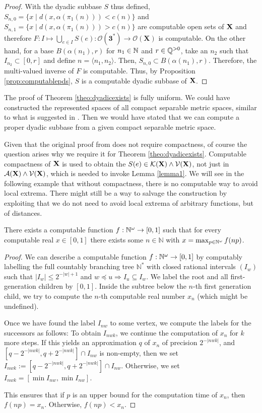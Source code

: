 \documentclass{eptcs-modified}
\begin{document}
\begin{proof}
With the dyadic subbase $S$ thus defined, $S_{n,0} = \{x \mid d(x, \alpha(\pi_1(n))) < c(n)\}$ and
$S_{n,1} = \{x \mid d(x, \alpha(\pi_1(n))) > c(n)\}$
are computable open sets of $\mathbf{X}$ and therefore $F: I \mapsto \bigcup_{e \in I} S(e): \mathcal{O}(\mathbf{3}^*) \to \mathcal{O}(\mathbf{X})$ is computable.
On the other hand,  for a base $B(\alpha(n_1), r)$ for $n_1 \in \mathbb{N}$ and $r \in \mathbb{Q}^{>0}$, take an $n_2$ such that $I_{n_2} \subset [0, r]$ and
define $n = \langle n_1, n_2 \rangle$. Then,
$S_{n,0} \subset B(\alpha(n_1), r)$.  Therefore, the multi-valued inverse of $F$ is computable.
Thus, by Proposition \ref{prop:computablepds},
$S$ is a computable dyadic subbase of $\mathbf{X}$.
\end{proof}

The proof of Theorem \ref{theo:dyadicexists} is fully uniform. We could have constructed the represented spaces of all compact separable metric spaces, similar to what is suggested in \cite{rettinger2}. Then we would have stated that we can compute a proper dyadic subbase from a given compact separable metric space.

Given that the original proof from \cite[Section 3.1]{tsukamoto} does not require compactness, of course the question arises why we require it for Theorem \ref{theo:dyadicexists}. Computable compactness of $\mathbf{X}$ is used to obtain the $S(e) \in \mathcal{K}(\mathbf{X}) \wedge \mathcal{V}(\mathbf{X})$, not just in $\mathcal{A}(\mathbf{X}) \wedge \mathcal{V}(\mathbf{X})$, which is needed to invoke Lemma \ref{lemma1}. We will see in the following example that without compactness, there is no computable way to avoid local extrema. There might still be a way to salvage the construction by exploiting that we do not need to avoid local extrema of arbitrary functions, but of distances.

\begin{example}
There exists a computable function $f : {\mathbb{N}^\omega} \to [0,1]$ such that for every computable real $x \in [0,1]$ there exists some $n \in \mathbb{N}$ with $x = \max_{p \in {\mathbb{N}^\omega}} f(np)$.
\begin{proof}
We can describe a computable function $f : {\mathbb{N}^\omega} \to [0,1]$ by computably labelling the full countably branching tree $\mathbb{N}^*$ with closed rational intervals $(I_w)$ such that $|I_w| \leq 2^{-|w|+1}$ and $w \preceq u \Rightarrow I_u \subseteq I_w$. We label the root and all first-generation children by $[0,1]$. Inside the subtree below the $n$-th first generation child, we try to compute the $n$-th computable real number $x_n$ (which might be undefined).

Once we have found the label $I_{nw}$ to some vertex, we compute the labels for the successors as follows: To obtain $I_{nwk}$, we continue the computation of $x_n$ for $k$ more steps. If this yields an approximation $q$ of $x_n$ of precision $2^{-|nwk|}$, and $[q - 2^{-|nwk|}, q + 2^{-|nwk|}] \cap I_{nw}$ is non-empty, then we set $I_{nwk} := [q - 2^{-|nwk|}, q + 2^{-|nwk|}] \cap I_{nw}$. Otherwise, we set $I_{nwk} = [\min I_{nw}, \min I_{nw}]$.

This ensures that if $p$ is an upper bound for the computation time of $x_n$, then $f(np) = x_n$. Otherwise, $f(np) < x_n$.
\end{proof}
\end{example}
\end{document}
